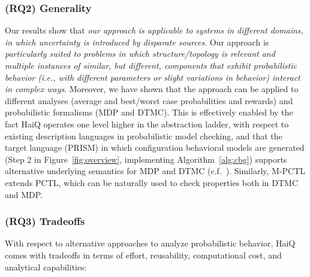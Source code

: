 \documentclass[10pt,journal,compsoc]{IEEEtran}
\begin{document}
\subsubsection{(RQ2) Generality} Our results show that {\it our approach is applicable to systems in different domains, in which uncertainty is introduced by disparate sources}.
Our approach is {\it particularly suited to problems in which structure/topology is relevant and multiple instances of similar, but different, components that exhibit probabilistic behavior (i.e., with different parameters or slight variations in behavior) interact in complex ways}. 
Moreover, we have shown that the approach can be applied to different analyses (average and best/worst case probabilities and rewards) and probabilistic formalisms (MDP and DTMC). This is effectively enabled by the fact HaiQ operates one level higher in the abstraction ladder, with respect to existing description languages in probabilistic model checking, and that the target language (PRISM) in which configuration behavioral models are generated (Step 2 in Figure~\ref{fig:overview}, implementing Algorithm~\ref{alg:cbg}) supports alternative underlying semantics for MDP and DTMC (c.f.~\cite{prismsemantics}). Similarly, M-PCTL extends PCTL, which can be naturally used to check properties both in DTMC and MDP. 

\subsubsection{(RQ3) Tradeoffs} \label{sec:tradeoffs} With respect to alternative approaches to analyze probabilistic behavior, {\sf HaiQ} comes with tradeoffs in terms of effort, reusability, computational cost, and analytical capabilities:
\end{document}
